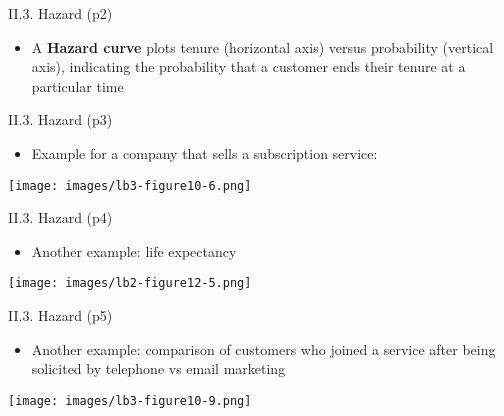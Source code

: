 \documentclass[handout]{beamer}
\newcommand{\stronger}[1]{\textbf{\color{purple} #1}}
\begin{document}
\begin{frame}{II.3. Hazard (p2)}
\begin{itemize}
\item A \stronger{Hazard curve} plots tenure (horizontal axis) versus probability (vertical axis), indicating the probability that a customer ends their tenure at a particular time 
\end{itemize}
\end{frame}
\begin{frame}{II.3. Hazard (p3)}
\begin{itemize}
\item Example for a company that sells a subscription service:
\end{itemize}
\begin{center}
\texttt{[image: images/lb3-figure10-6.png]}\\
\cite[Figure 10.6]{LB3:2011}
\end{center}
\end{frame}
\begin{frame}{II.3. Hazard (p4)}
\begin{itemize}
\item Another example: life expectancy
\end{itemize}
\begin{center}
\texttt{[image: images/lb2-figure12-5.png]} \\
\cite[Figure 12.5]{LB2:2004}
\end{center}
\end{frame}
\begin{frame}{II.3. Hazard (p5)}
\begin{itemize}
\item Another example: comparison of customers who joined a service after being solicited by telephone vs email marketing 
\end{itemize}
\begin{center}
\texttt{[image: images/lb3-figure10-9.png]} \\
\cite[Figure 10.9]{LB3:2011}
\end{center}
\end{frame}
\end{document}
